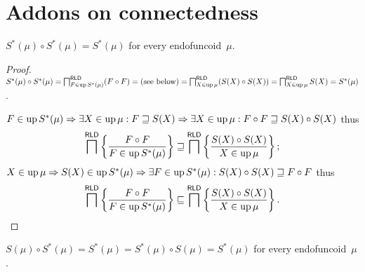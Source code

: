 \chapter{Addons on connectedness}

\begin{thm}
  $S^{\ast} (\mu) \circ S^{\ast} (\mu) = S^{\ast} (\mu)$
  for every endofuncoid~$\mu$.
\end{thm}

\begin{proof}
  $S^{\ast} (\mu) \circ S^{\ast} (\mu) = \bigsqcap^{\mathsf{RLD}}_{F
  \in \operatorname{up} S^{\ast} (\mu)} (F \circ F) = \text{(see below)} =
  \bigsqcap^{\mathsf{RLD}}_{X \in \operatorname{up} \mu} (S (X) \circ S (X)) =
  \bigsqcap^{\mathsf{RLD}}_{X \in \operatorname{up} \mu} S (X) = S^{\ast}
  (\mu)$.
  
  $F \in \operatorname{up} S^{\ast} (\mu) \Rightarrow \exists X \in \operatorname{up} \mu : F
  \sqsupseteq S (X) \Rightarrow \exists X \in \operatorname{up} \mu : F \circ F
  \sqsupseteq S (X) \circ S (X)$ thus
  \[ \bigsqcap^{\mathsf{RLD}} \left\{ \frac{ F \circ F}{
     F \in \operatorname{up} S^{\ast} (\mu) }\right\} \sqsupseteq
     \bigsqcap^{\mathsf{RLD}} \left\{ \frac{ S (X) \circ S (X) }{ X \in \operatorname{up} \mu }\right\} ; \]
  $X \in \operatorname{up} \mu \Rightarrow S (X) \in \operatorname{up} S^{\ast} (\mu)
  \Rightarrow \exists F \in \operatorname{up} S^{\ast} (\mu) : S (X) \circ S (X)
  \sqsupseteq F \circ F$ thus
  \[ \bigsqcap^{\mathsf{RLD}} \left\{ \frac{ F \circ F }{
     F \in \operatorname{up} S^{\ast} (\mu) }\right\} \sqsubseteq
     \bigsqcap^{\mathsf{RLD}} \left\{ \frac{ S (X) \circ S (X) }{ X \in \operatorname{up} \mu }\right\} . \]
\end{proof}

\begin{cor}
$S (\mu) \circ S^{\ast} (\mu) = S^{\ast} (\mu) =
S^{\ast} (\mu) \circ S (\mu) = S^{\ast} (\mu)$
for every endofuncoid~$\mu$.
\end{cor}
